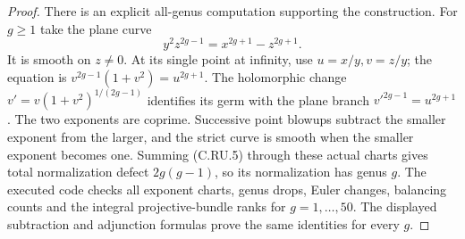\begin{proof}
There is an explicit all-genus computation supporting the construction.
For $g\ge1$ take the plane curve
\[
                 y^2z^{2g-1}=x^{2g+1}-z^{2g+1}.
\tag{C.RU.9}
\]
It is smooth on $z\ne0$. At its single point at infinity, use
$u=x/y,v=z/y$; the equation is $v^{2g-1}(1+v^2)=u^{2g+1}$.
The holomorphic change $v'=v(1+v^2)^{1/(2g-1)}$ identifies its germ with
the plane branch $v'^{2g-1}=u^{2g+1}$. The two exponents are coprime.
Successive point blowups subtract the smaller exponent from the larger,
and the strict curve is smooth when the smaller exponent becomes one.
Summing (C.RU.5) through these actual charts gives total normalization
defect $2g(g-1)$, so its normalization has genus $g$.
The executed code  checks all exponent
charts, genus drops, Euler changes, balancing counts and the integral
projective-bundle ranks for $g=1,\ldots,50$. The displayed subtraction
and adjunction formulas prove the same identities for every $g$.
\end{proof}
